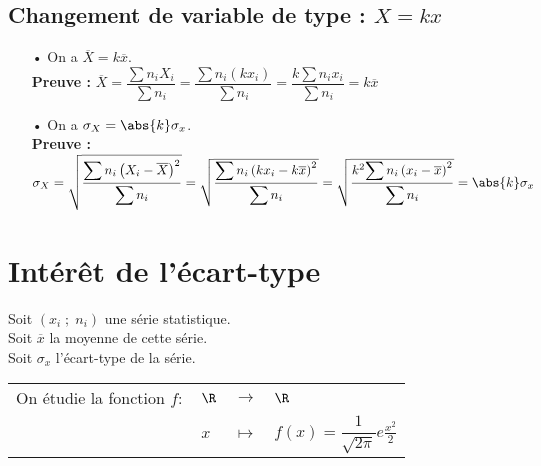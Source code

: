 \subsection{Changement de variable de type : $X = kx$}

\begin{itemize}
\item[•] On a $\overline{X} = k\overline{x}$. \\

\textbf{Preuve :} $\overline{X} = \dfrac{\displaystyle{\sum n_iX_i}}{\displaystyle{\sum n_i}} = \dfrac{\displaystyle{\sum n_i\left(kx_i\right)}}{\displaystyle{\sum n_i}} = \dfrac{k\displaystyle{\sum n_ix_i}}{\displaystyle{\sum n_i}} = k\overline{x}$ \\

\vspace*{.3cm}

\item[•] On a $\sigma_X = \abs{k}\sigma_x$. \\

\textbf{Preuve :} $\sigma_X = \sqrt{\dfrac{\displaystyle{\sum n_i\left(X_i - \overline{X}\right)^2}}{\displaystyle{\sum n_i}}} = \sqrt{\dfrac{\displaystyle{\sum n_i\left(kx_i - k\overline{x}\right)^2}}{\displaystyle{\sum n_i}}} = \sqrt{\dfrac{k^2\displaystyle{\sum n_i\left(x_i - \overline{x}\right)^2}}{\displaystyle{\sum n_i}}} = \abs{k}\sigma_x$ \\
\end{itemize}

\vspace*{-5cm}

\newpage

\section{Intérêt de l'écart-type}

Soit $\left(x_i \; ; \; n_i\right)$ une série statistique. \\
Soit $\overline{x}$ la moyenne de cette série. \\
Soit $\sigma_x$ l'écart-type de la série. \\

\begin{tabular}{llll}
\hspace{-.3cm} On étudie la fonction $f:$ & $\R$ & $\longrightarrow$ & $\R$ \\
& $x$ & $\longmapsto$ & $f(x) = \dfrac{1}{\sqrt{2\pi}}e
{\frac{x^2}{2}}$ \\
\end{tabular}

